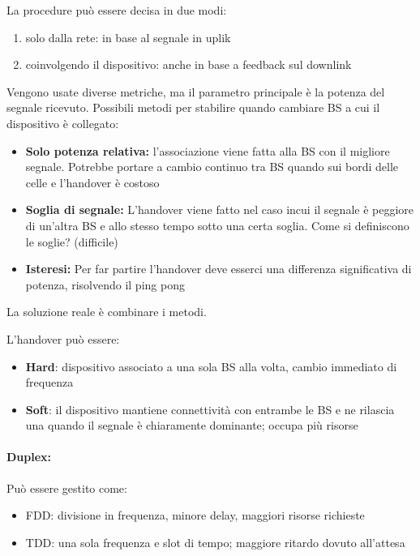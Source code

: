 La procedure può essere decisa in due modi:
\begin{enumerate}
    \item solo dalla rete: in base al segnale in uplik
    
    \item coinvolgendo il dispositivo: anche in base a feedback sul downlink
\end{enumerate}

Vengono usate diverse metriche, ma il parametro principale è la potenza del segnale ricevuto. Possibili metodi per stabilire quando cambiare BS a cui il dispositivo è collegato: 
\begin{itemize}
    \item \textbf{Solo potenza relativa:} l'associazione viene fatta alla BS con il migliore segnale. Potrebbe portare a cambio continuo tra BS quando sui bordi delle celle e l'handover è costoso
    
    \item \textbf{Soglia di segnale:} L'handover viene fatto nel caso incui il segnale è peggiore di un'altra BS e allo stesso tempo sotto una certa soglia. Come si definiscono le soglie? (difficile)
    
    \item \textbf{Isteresi:} Per far partire l'handover deve esserci una differenza significativa di potenza, risolvendo il ping pong
\end{itemize}

La soluzione reale è combinare i metodi.

L'handover può essere:
\begin{itemize}
    \item \textbf{Hard}: dispositivo associato a una sola BS alla volta, cambio immediato di frequenza
    
    \item \textbf{Soft}: il dispositivo mantiene connettività con entrambe le BS e ne rilascia una quando il segnale è chiaramente dominante; occupa più risorse
\end{itemize}

\paragraph{Duplex:} Può essere gestito come: 
\begin{itemize}
    \item FDD: divisione in frequenza, minore delay, maggiori risorse richieste
    
    \item TDD: una sola frequenza e slot di tempo; maggiore ritardo dovuto all'attesa
\end{itemize}